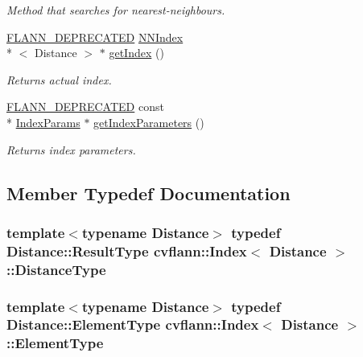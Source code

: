 \begin{DoxyCompactItemize}
\begin{DoxyCompactList}\small\item\em Method that searches for nearest-\/neighbours. \end{DoxyCompactList}\item 
\hyperlink{defines_8h_a7c6f4b56c7a5c676e28c6c6ce0c94fe1}{F\-L\-A\-N\-N\-\_\-\-D\-E\-P\-R\-E\-C\-A\-T\-E\-D} \hyperlink{classcvflann_1_1NNIndex}{N\-N\-Index}\\*
$<$ Distance $>$ $\ast$ \hyperlink{classcvflann_1_1Index_ac98f80cf8db92245ad28eebe8c72fe69}{get\-Index} ()
\begin{DoxyCompactList}\small\item\em Returns actual index. \end{DoxyCompactList}\item 
\hyperlink{defines_8h_a7c6f4b56c7a5c676e28c6c6ce0c94fe1}{F\-L\-A\-N\-N\-\_\-\-D\-E\-P\-R\-E\-C\-A\-T\-E\-D} const \\*
\hyperlink{namespacecvflann_a742b4c7076c21012054af74a9ee48289}{Index\-Params} $\ast$ \hyperlink{classcvflann_1_1Index_a43b42dbb54c0c923a084d192bfe09073}{get\-Index\-Parameters} ()
\begin{DoxyCompactList}\small\item\em Returns index parameters. \end{DoxyCompactList}\end{DoxyCompactItemize}


\subsection{Member Typedef Documentation}
\hypertarget{classcvflann_1_1Index_adce66132d9ad41de0181fddd214b5e51}{
\subsubsection[{Distance\-Type}]{\setlength{\rightskip}{0pt plus 5cm}template$<$typename Distance$>$ typedef Distance\-::\-Result\-Type {\bf cvflann\-::\-Index}$<$ Distance $>$\-::{\bf Distance\-Type}}}\label{classcvflann_1_1Index_adce66132d9ad41de0181fddd214b5e51}
\hypertarget{classcvflann_1_1Index_a9fbfc2c13b3226997cfc15fc3a55b7c5}{
\subsubsection[{Element\-Type}]{\setlength{\rightskip}{0pt plus 5cm}template$<$typename Distance$>$ typedef Distance\-::\-Element\-Type {\bf cvflann\-::\-Index}$<$ Distance $>$\-::{\bf Element\-Type}}}\label{classcvflann_1_1Index_a9fbfc2c13b3226997cfc15fc3a55b7c5}


